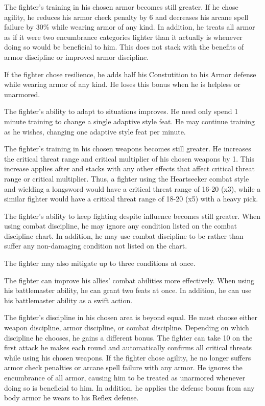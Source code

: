  The fighter's training in his chosen armor becomes still greater. If he chose agility, he reduces his armor check penalty by 6 and decreases his arcane spell failure by 30\% while wearing armor of any kind. In addition, he treats all armor as if it were two encumbrance categories lighter than it actually is whenever doing so would be beneficial to him. This does not stack with the benefits of armor discipline or improved armor discipline.

If the fighter chose resilience, he adds half his Constutition to his Armor defense while wearing armor of any kind. He loses this bonus when he is helpless or unarmored.

 The fighter's ability to adapt to situations improves. He need only spend 1 minute training to change a single adaptive style feat. He may continue training as he wishes, changing one adaptive style feat per minute.

 The fighter's training in his chosen weapons becomes still greater. He increases the critical threat range and critical multiplier of his chosen weapons by 1. This increase applies after and stacks with any other effects that affect critical threat range or critical multiplier. Thus, a fighter using the Heartseeker combat style and wielding a longsword would have a critical threat range of 16-20 (x3), while a similar fighter would have a critical threat range of 18-20 (x5) with a heavy pick.

 The fighter's ability to keep fighting despite influence becomes still greater. When using combat discipline, he may ignore any condition listed on the combat discipline chart. In addition, he may use combat discipline to be \dazed rather than suffer any non-damaging condition not listed on the chart.

\par The fighter may also mitigate up to three conditions at once.

 The fighter can improve his allies' combat abilities more effectively. When using his battlemaster ability, he can grant two feats at once. In addition, he can use his battlemaster ability as a swift action.

 The fighter's discipline in his chosen area is beyond equal. He must choose either weapon discipline, armor discipline, or combat discipline. Depending on which discipline he chooses, he gains a different bonus.
 The fighter can take 10 on the first attack he makes each round and automatically confirms all critical threats while using his chosen weapons.
 If the fighter chose agility, he no longer suffers armor check penalties or arcane spell failure with any armor. He ignores the encumbrance of all armor, causing him to be treated as unarmored whenever doing so is beneficial to him. In addition, he applies the defense bonus from any body armor he wears to his Reflex defense.

